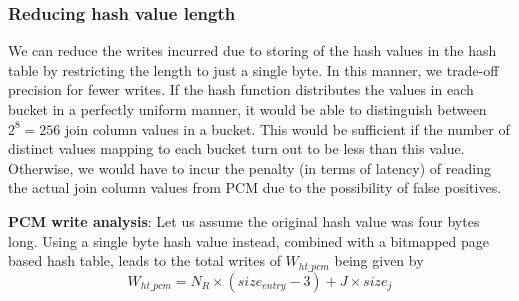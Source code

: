 \subsubsection{Reducing hash value length}
We can reduce the writes incurred due to storing of the hash values in
the hash table by restricting the length to just a single byte. In this
manner, we trade-off precision for fewer writes. If the hash function
distributes the values in each bucket in a perfectly uniform manner, it
would be able to distinguish between $2^8 = 256$ join column values in a
bucket. This would be sufficient if the number of distinct values mapping
to each bucket turn out to be less than this value. Otherwise, we would
have to incur the penalty (in terms of latency) of reading the actual join
column values from PCM due to the possibility of false positives.

\textbf{PCM write analysis}: Let us assume the original hash value
was four bytes long. Using a single byte hash value instead, combined
with a bitmapped page based hash table, leads to the total writes of
$W_{ht\_pcm}$ being given by
\begin{equation}\label{eq:ht_pcm}
W_{ht\_pcm} = N_R \times (size_{entry} - 3)+ J \times size_{j}
\end{equation}
	


